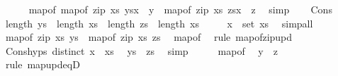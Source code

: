 \begin{isabellebody}
\ \ \ \ \isamarkupfalse%
\ map{\isacharunderscore}{\kern0pt}of{\isacharcolon}{\kern0pt}\ {\isachardoublequoteopen}map{\isacharunderscore}{\kern0pt}of\ {\isacharparenleft}{\kern0pt}zip\ xs\ ys{\isacharparenright}{\kern0pt}{\isacharparenleft}{\kern0pt}x\ {\isasymmapsto}\ y{\isacharparenright}{\kern0pt}\ {\isacharequal}{\kern0pt}\ map{\isacharunderscore}{\kern0pt}of\ {\isacharparenleft}{\kern0pt}zip\ xs\ zs{\isacharparenright}{\kern0pt}{\isacharparenleft}{\kern0pt}x\ {\isasymmapsto}\ z{\isacharparenright}{\kern0pt}{\isachardoublequoteclose}\ \isamarkupfalse%
\ simp\isanewline
\ \ \isamarkupfalse%
\ Cons\ \isamarkupfalse%
\ {\isachardoublequoteopen}length\ ys\ {\isacharequal}{\kern0pt}\ length\ xs{\isachardoublequoteclose}\ \ {\isachardoublequoteopen}length\ zs\ {\isacharequal}{\kern0pt}\ length\ xs{\isachardoublequoteclose}\isanewline
\ \ \ \ \ {\isachardoublequoteopen}x\ {\isasymnotin}\ set\ xs{\isachardoublequoteclose}\ \isamarkupfalse%
\ simp{\isacharunderscore}{\kern0pt}all\isanewline
\ \ \isamarkupfalse%
\ \isamarkupfalse%
\ {\isachardoublequoteopen}map{\isacharunderscore}{\kern0pt}of\ {\isacharparenleft}{\kern0pt}zip\ xs\ ys{\isacharparenright}{\kern0pt}\ {\isacharequal}{\kern0pt}\ map{\isacharunderscore}{\kern0pt}of\ {\isacharparenleft}{\kern0pt}zip\ xs\ zs{\isacharparenright}{\kern0pt}{\isachardoublequoteclose}\ \isamarkupfalse%
\ map{\isacharunderscore}{\kern0pt}of\ \isamarkupfalse%
\ {\isacharparenleft}{\kern0pt}rule\ map{\isacharunderscore}{\kern0pt}of{\isacharunderscore}{\kern0pt}zip{\isacharunderscore}{\kern0pt}upd{\isacharparenright}{\kern0pt}\isanewline
\ \ \isamarkupfalse%
\ Cons{\isachardot}{\kern0pt}hyps\ {\isacartoucheopen}distinct\ {\isacharparenleft}{\kern0pt}x\ {\isacharhash}{\kern0pt}\ xs{\isacharparenright}{\kern0pt}{\isacartoucheclose}\ \isamarkupfalse%
\ {\isachardoublequoteopen}ys\ {\isacharequal}{\kern0pt}\ zs{\isachardoublequoteclose}\ \isamarkupfalse%
\ simp\isanewline
\ \ \isamarkupfalse%
\ \isamarkupfalse%
\ map{\isacharunderscore}{\kern0pt}of\ \isamarkupfalse%
\ {\isachardoublequoteopen}y\ {\isacharequal}{\kern0pt}\ z{\isachardoublequoteclose}\ \isamarkupfalse%
\ {\isacharparenleft}{\kern0pt}rule\ map{\isacharunderscore}{\kern0pt}upd{\isacharunderscore}{\kern0pt}eqD{}{\isacharparenright}{\kern0pt}\isanewline
\ \ \isamarkupfalse%

\end{isabellebody}
